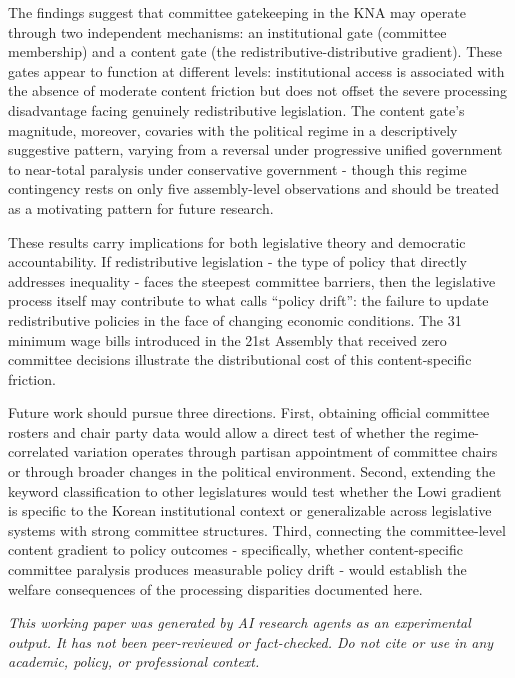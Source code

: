 \documentclass[11pt]{article}
\begin{document}
The findings suggest that committee gatekeeping in the KNA may operate through two independent mechanisms: an institutional gate (committee membership) and a content gate (the redistributive-distributive gradient). These gates appear to function at different levels: institutional access is associated with the absence of moderate content friction but does not offset the severe processing disadvantage facing genuinely redistributive legislation. The content gate's magnitude, moreover, covaries with the political regime in a descriptively suggestive pattern, varying from a reversal under progressive unified government to near-total paralysis under conservative government - though this regime contingency rests on only five assembly-level observations and should be treated as a motivating pattern for future research.

These results carry implications for both legislative theory and democratic accountability. If redistributive legislation - the type of policy that directly addresses inequality - faces the steepest committee barriers, then the legislative process itself may contribute to what \citet{hacker2004} calls ``policy drift'': the failure to update redistributive policies in the face of changing economic conditions. The 31 minimum wage bills introduced in the 21st Assembly that received zero committee decisions illustrate the distributional cost of this content-specific friction.

Future work should pursue three directions. First, obtaining official committee rosters and chair party data would allow a direct test of whether the regime-correlated variation operates through partisan appointment of committee chairs or through broader changes in the political environment. Second, extending the keyword classification to other legislatures would test whether the Lowi gradient is specific to the Korean institutional context or generalizable across legislative systems with strong committee structures. Third, connecting the committee-level content gradient to policy outcomes - specifically, whether content-specific committee paralysis produces measurable policy drift - would establish the welfare consequences of the processing disparities documented here.

\bigskip
\noindent\textit{This working paper was generated by AI research agents as an
experimental output. It has not been peer-reviewed or fact-checked.
Do not cite or use in any academic, policy, or professional context.}




\end{document}
